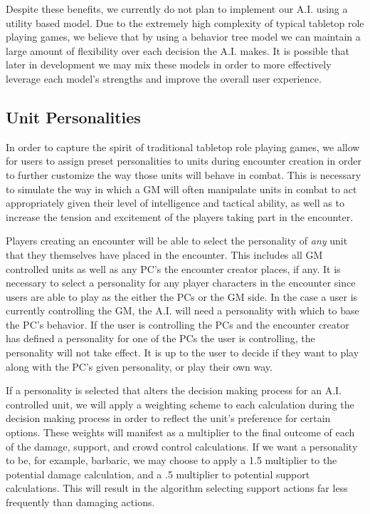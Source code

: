 \documentclass[12pt,a4paper]{report}
\begin{document}
		Despite these benefits, we currently do not plan to implement our A.I. using a utility based model. Due to the extremely high complexity of typical tabletop role playing games, we believe that by using a behavior tree model we can maintain a large amount of flexibility over each decision the A.I. makes. It is possible that later in development we may mix these models in order to more effectively leverage each model's strengths and improve the overall user experience. 
		
		\subsection{Unit Personalities}
		In order to capture the spirit of traditional tabletop role playing games, we allow for users to assign preset personalities to units during encounter creation in order to further customize the way those units will behave in combat. This is necessary to simulate the way in which a GM will often manipulate units in combat to act appropriately given their level of intelligence and tactical ability, as well as to increase the tension and excitement of the players taking part in the encounter. 
		
		Players creating an encounter will be able to select the personality of \textit{any} unit that they themselves have placed in the encounter. This includes all GM controlled units as well as any PC's the encounter creator places, if any. It is necessary to select a personality for any player characters in the encounter since users are able to play as the either the PCs or the GM side. In the case a user is currently controlling the GM, the A.I. will need a personality with which to base the PC's behavior. If the user is controlling the PCs and the encounter creator has defined a personality for one of the PCs the user is controlling, the personality will not take effect. It is up to the user to decide if they want to play along with the PC's given personality, or play their own way. 
		
		If a personality is selected that alters the decision making process for an A.I. controlled unit, we will apply a weighting scheme to each calculation during the decision making process in order to reflect the unit's preference for certain options. These weights will  manifest as a multiplier to the final outcome of each of the damage, support, and crowd control calculations. If we want a personality to be, for example, barbaric, we may choose to apply a 1.5 multiplier to the potential damage calculation, and a .5 multiplier to potential support calculations. This will result in the algorithm selecting support actions far less frequently than damaging actions. 
		
\end{document}
